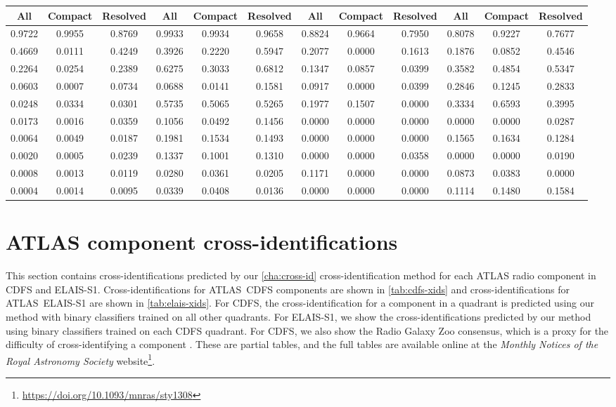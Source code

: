 \begin{table}
\begin{tabular}{cccccccccccc}
All & Compact & Resolved & All & Compact & Resolved & All & Compact & Resolved & All & Compact & Resolved \\
      \hline
0.9722 & 0.9955 & 0.8769 & 0.9933 & 0.9934 & 0.9658 & 0.8824 & 0.9664 & 0.7950 & 0.8078 & 0.9227 & 0.7677 \\
0.4669 & 0.0111 & 0.4249 & 0.3926 & 0.2220 & 0.5947 & 0.2077 & 0.0000 & 0.1613 & 0.1876 & 0.0852 & 0.4546 \\
0.2264 & 0.0254 & 0.2389 & 0.6275 & 0.3033 & 0.6812 & 0.1347 & 0.0857 & 0.0399 & 0.3582 & 0.4854 & 0.5347 \\
0.0603 & 0.0007 & 0.0734 & 0.0688 & 0.0141 & 0.1581 & 0.0917 & 0.0000 & 0.0399 & 0.2846 & 0.1245 & 0.2833 \\
0.0248 & 0.0334 & 0.0301 & 0.5735 & 0.5065 & 0.5265 & 0.1977 & 0.1507 & 0.0000 & 0.3334 & 0.6593 & 0.3995 \\
0.0173 & 0.0016 & 0.0359 & 0.1056 & 0.0492 & 0.1456 & 0.0000 & 0.0000 & 0.0000 & 0.0000 & 0.0000 & 0.0287 \\
0.0064 & 0.0049 & 0.0187 & 0.1981 & 0.1534 & 0.1493 & 0.0000 & 0.0000 & 0.0000 & 0.1565 & 0.1634 & 0.1284 \\
0.0020 & 0.0005 & 0.0239 & 0.1337 & 0.1001 & 0.1310 & 0.0000 & 0.0000 & 0.0358 & 0.0000 & 0.0000 & 0.0190 \\
0.0008 & 0.0013 & 0.0119 & 0.0280 & 0.0361 & 0.0205 & 0.1171 & 0.0000 & 0.0000 & 0.0873 & 0.0383 & 0.0000 \\
0.0004 & 0.0014 & 0.0095 & 0.0339 & 0.0408 & 0.0136 & 0.0000 & 0.0000 & 0.0000 & 0.1114 & 0.1480 & 0.1584 \\
      \hline\hline
    \end{tabular}
  \end{table}

\section{ATLAS component cross-identifications}\label{sec:atlas-xid-xids}
  
  This section contains cross-identifications predicted by our \autoref{cha:cross-id} cross-identification method for each
  ATLAS radio component in CDFS and ELAIS-S1. Cross-identifications for
  ATLAS~CDFS components are shown in \autoref{tab:cdfs-xids} and
  cross-identifications for ATLAS~ELAIS-S1 are shown in
  \autoref{tab:elais-xids}. For CDFS, the cross-identification for a component
  in a quadrant is predicted using our method with binary classifiers trained
  on all other quadrants. For ELAIS-S1, we show the cross-identifications
  predicted by our method using binary classifiers trained on each CDFS
  quadrant. For CDFS, we also show the Radio Galaxy Zoo consensus, which is a
  proxy for the difficulty of cross-identifying a component \citep{wong21rgz}. These are partial tables, and the full tables are available online at the \emph{Monthly Notices of the Royal Astronomy Society} website\footnote{\url{https://doi.org/10.1093/mnras/sty1308}}.

